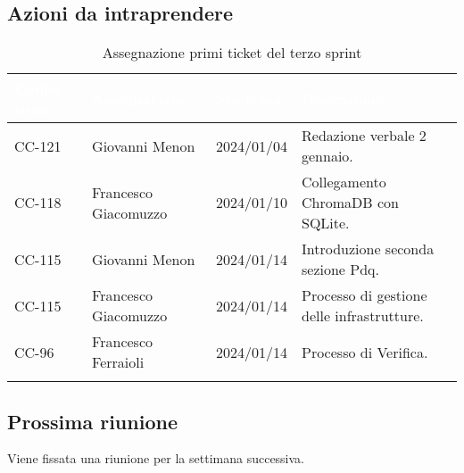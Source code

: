 \subsection{Azioni da intraprendere}
{
    \setlength{\tabcolsep}{10pt}
            \renewcommand{\arraystretch}{1.5}
            \begin{xltabular}{\textwidth}{| l | X | l | X |}
                 \hline
                 \textbf{\textcolor{white}{Codice issue}} & \textbf{\textcolor{white}{Assegnatario}} & \textbf{\textcolor{white}{Scadenza}} & \textbf{\textcolor{white}{Descrizione}} \\
                 \hline
                 \endhead
                 CC-121 & Giovanni Menon & 2024/01/04 & Redazione verbale 2 gennaio. \\
                 \hline
                 CC-118 & Francesco Giacomuzzo & 2024/01/10 & Collegamento ChromaDB con SQLite.  \\
                 \hline
                 CC-115 & Giovanni Menon & 2024/01/14 & Introduzione seconda sezione Pdq. \\
                 \hline
                 CC-115 & Francesco Giacomuzzo & 2024/01/14 & Processo di gestione delle infrastrutture. \\
                 \hline
                 CC-96 & Francesco Ferraioli & 2024/01/14 & Processo di Verifica. \\
                 \hline
                  \caption{Assegnazione primi ticket del terzo sprint}
            \end{xltabular}
}


\subsection{Prossima riunione} \label{subsec:riunione}
Viene fissata una riunione per la settimana successiva.
